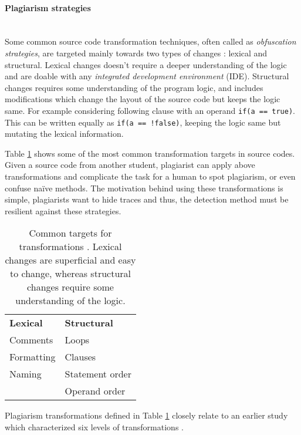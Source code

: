 \paragraph{Plagiarism strategies}\mbox{}\\
Some common source code transformation techniques, often called as \emph{obfuscation strategies}, are targeted mainly towards two types of changes \cite{PlagInProg1999}: lexical and structural. Lexical changes doesn't require a deeper understanding of the logic and are doable with any \emph{integrated development environment} (IDE). Structural changes requires some understanding of the program logic, and includes modifications which change the layout of the source code but keeps the logic same. For example considering following clause with an operand \texttt{if(a == true)}. This can be written equally as \texttt{if(a == !false)}, keeping the logic same but mutating the lexical information.

Table \ref{tbl-plag-strat} shows some of the most common transformation targets in source codes. Given a source code from another student, plagiarist can apply above transformations and complicate the task for a human to spot plagiarism, or even confuse naïve methods. The motivation behind using these transformations is simple, plagiarists want to hide traces and thus, the detection method must be resilient against these strategies.

\newpage

\begin{table}[ht]
\centering
\caption{Common targets for transformations \cite{PlagInProg1999}. Lexical changes are superficial and easy to change, whereas structural changes require some understanding of the logic.}
\label{tbl-plag-strat}
\begin{tabular}{|l|l|} \hline
 \textbf{Lexical} & \textbf{Structural} \\ \hhline{|=|=|}
 Comments                    & Loops                          \\
 Formatting                  & Clauses                        \\
 Naming                      & Statement order                \\
                             & Operand order               \\ \hline
\end{tabular}
\end{table}



Plagiarism transformations defined in Table \ref{tbl-plag-strat} closely relate to an earlier study which characterized six levels of transformations \cite{Faidhi:1987:EAD:27319.27321}.

